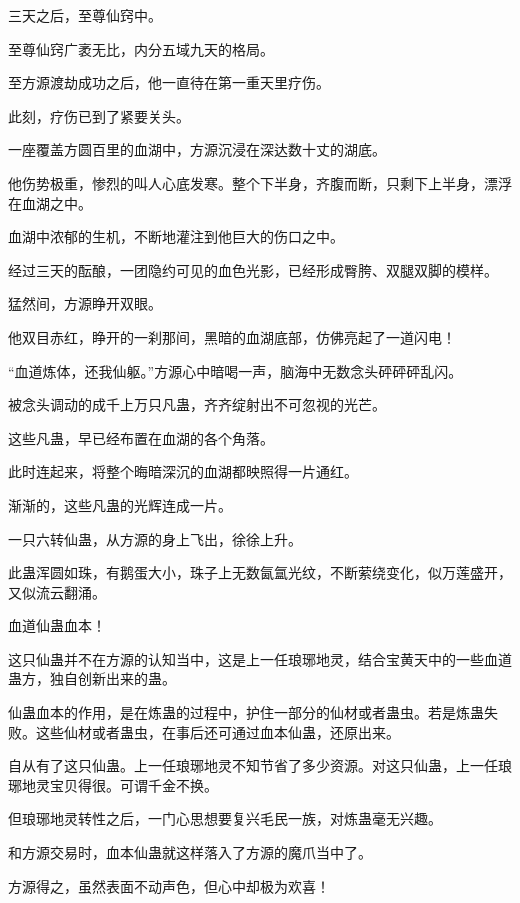 
\begin{this_body}

三天之后，至尊仙窍中。

至尊仙窍广袤无比，内分五域九天的格局。

至方源渡劫成功之后，他一直待在第一重天里疗伤。

此刻，疗伤已到了紧要关头。

一座覆盖方圆百里的血湖中，方源沉浸在深达数十丈的湖底。

他伤势极重，惨烈的叫人心底发寒。整个下半身，齐腹而断，只剩下上半身，漂浮在血湖之中。

血湖中浓郁的生机，不断地灌注到他巨大的伤口之中。

经过三天的酝酿，一团隐约可见的血色光影，已经形成臀胯、双腿双脚的模样。

猛然间，方源睁开双眼。

他双目赤红，睁开的一刹那间，黑暗的血湖底部，仿佛亮起了一道闪电！

“血道炼体，还我仙躯。”方源心中暗喝一声，脑海中无数念头砰砰砰乱闪。

被念头调动的成千上万只凡蛊，齐齐绽射出不可忽视的光芒。

这些凡蛊，早已经布置在血湖的各个角落。

此时连起来，将整个晦暗深沉的血湖都映照得一片通红。

渐渐的，这些凡蛊的光辉连成一片。

一只六转仙蛊，从方源的身上飞出，徐徐上升。

此蛊浑圆如珠，有鹅蛋大小，珠子上无数氤氲光纹，不断萦绕变化，似万莲盛开，又似流云翻涌。

血道仙蛊血本！

这只仙蛊并不在方源的认知当中，这是上一任琅琊地灵，结合宝黄天中的一些血道蛊方，独自创新出来的蛊。

仙蛊血本的作用，是在炼蛊的过程中，护住一部分的仙材或者蛊虫。若是炼蛊失败。这些仙材或者蛊虫，在事后还可通过血本仙蛊，还原出来。

自从有了这只仙蛊。上一任琅琊地灵不知节省了多少资源。对这只仙蛊，上一任琅琊地灵宝贝得很。可谓千金不换。

但琅琊地灵转性之后，一门心思想要复兴毛民一族，对炼蛊毫无兴趣。

和方源交易时，血本仙蛊就这样落入了方源的魔爪当中了。

方源得之，虽然表面不动声色，但心中却极为欢喜！


\end{this_body}
